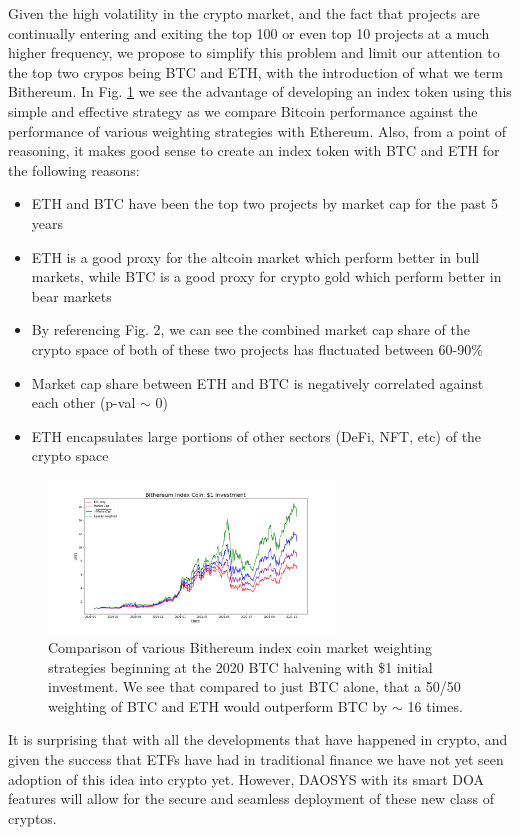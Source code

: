 \documentclass[journal,twocolumn,12pt]{ieeesyscoin}
\begin{document}
Given the high volatility in the crypto market, and the fact that projects are continually entering and exiting the top 100 or even top 10 projects at a much higher frequency, we propose to simplify this problem and limit our attention to the top two crypos being BTC and ETH, with the introduction of what we term Bithereum. In Fig. \ref{fig:crypto_index} we see the advantage of developing an index token using this simple and effective strategy as we compare Bitcoin performance against the performance of various weighting strategies with Ethereum. Also, from a point of reasoning, it makes good sense to create an index token with BTC and ETH for the following reasons:

\begin{itemize}
  \item ETH and BTC have been the top two projects by market cap for the past 5 years
  \item ETH is a good proxy for the altcoin market which perform better in bull markets, while BTC is a good proxy for crypto gold which perform better in bear markets
  \item By referencing Fig. 2, we can see the combined market cap share of the crypto space of both of these two projects has fluctuated between 60-90\%
  \item Market cap share between ETH and BTC is negatively correlated against each other (p-val $\sim$ 0)
  \item ETH encapsulates large portions of other sectors (DeFi, NFT, etc) of the crypto space
\end{itemize}  

\begin{figure}[h!]
\includegraphics[width=3in]{img/index_coin.png}
\caption{Comparison of various Bithereum index coin market weighting strategies beginning at the 2020 BTC halvening with \$1 initial investment. We see that compared to just BTC alone, that a 50/50 weighting of BTC and ETH would outperform BTC by $\sim$ 16 times.} 
\label{fig:crypto_index}
\end{figure} 

It is surprising that with all the developments that have happened in crypto, and given the success that ETFs have had in traditional finance we have not yet seen adoption of this idea into crypto yet. However, DAOSYS with its smart DOA features will allow for the secure and seamless deployment of these new class of cryptos.  
\end{document}
